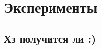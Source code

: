 \chapter{Эксперименты}\label{ch:ch4}

\section{Хз получится ли :)}\label{ch:ch3/sect1}


\clearpage
